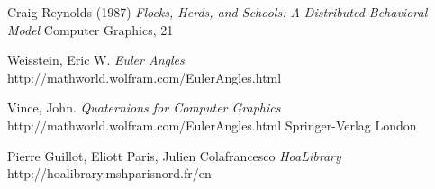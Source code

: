 \documentclass[journal, a4paper]{IEEEtran}
\begin{document}
\begin{thebibliography}{1}

Craig Reynolds (1987)
\textit{Flocks, Herds, and Schools: A Distributed Behavioral Model}
Computer Graphics, 21

Weisstein, Eric W.
\textit{Euler Angles}
http://mathworld.wolfram.com/EulerAngles.html


Vince, John.
\textit{Quaternions for Computer Graphics}
http://mathworld.wolfram.com/EulerAngles.html
Springer-Verlag London

Pierre Guillot, Eliott Paris, Julien Colafrancesco
\textit{HoaLibrary}
http://hoalibrary.mshparisnord.fr/en

\end{thebibliography}


\end{document}
